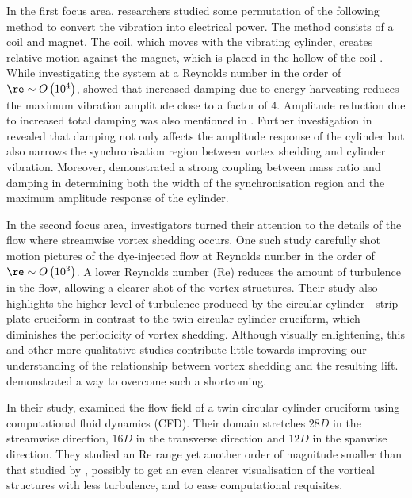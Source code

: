 \documentclass[a4paper,fleqn]{cas-sc}
\begin{document}
In the first focus area, researchers studied some permutation of the following method to convert the vibration into electrical power. The method consists of a coil and magnet. The coil, which moves with the vibrating cylinder, creates relative motion against the magnet, which is placed in the hollow of the coil \citep{Koide2009}. While investigating the system at a Reynolds number in the order of $\re \sim O \left( 10^{4} \right)$, \citet{Koide2009} showed that increased damping due to energy harvesting reduces the maximum vibration amplitude close to a factor of 4. Amplitude reduction due to increased total damping was also mentioned in \citet{Bernitsas2008a,Bernitsas2008b,Bernitsas2009}. Further investigation in \citet{Nguyen2012} revealed that damping not only affects the amplitude response of the cylinder but also narrows the synchronisation region between vortex shedding and cylinder vibration. Moreover, \citet{Nguyen2012} demonstrated a strong coupling between mass ratio and damping in determining both the width of the synchronisation region and the maximum amplitude response of the cylinder.

In the second focus area, investigators turned their attention to the details of the flow where streamwise vortex shedding occurs. One such study carefully shot motion pictures of the dye-injected flow \citep{Koide2017} at Reynolds number in the order of $\re \sim O\left( 10^{3} \right)$. A lower Reynolds number (Re) reduces the amount of turbulence in the flow, allowing a clearer shot of the vortex structures. Their study also highlights the higher level of turbulence produced by the circular cylinder---strip-plate cruciform in contrast to the twin circular cylinder cruciform, which diminishes the periodicity of vortex shedding. Although visually enlightening, this and other more qualitative studies contribute little towards improving our understanding of the relationship between vortex shedding and the resulting lift. \citet{Deng2007} demonstrated a way to overcome such a shortcoming.

In their study, \citet{Deng2007} examined the flow field of a twin circular cylinder cruciform using computational fluid dynamics (CFD). Their domain stretches  $28D$  in the streamwise direction,  $16D$  in the transverse direction and  $12D$  in the spanwise direction. They studied an Re range yet another order of magnitude smaller than that studied by \citet{Koide2017}, possibly to get an even clearer visualisation of the vortical structures with less turbulence, and to ease computational requisites.
\end{document}
